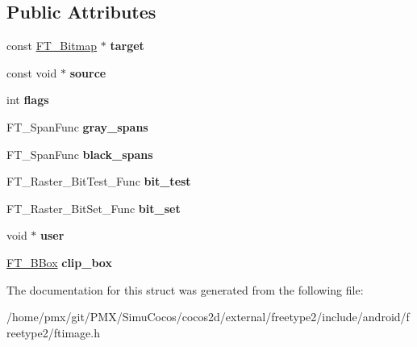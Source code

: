\subsection*{Public Attributes}
\begin{DoxyCompactItemize}
\item 
\mbox{\label{structFT__Raster__Params___a1180854ce8685d69061bb11de5f87665}} 
const \hyperlink{structFT__Bitmap__}{F\+T\+\_\+\+Bitmap} $\ast$ {\bfseries target}
\item 
\mbox{\label{structFT__Raster__Params___a00fa3f94836780ef70feb9d4785e98b8}} 
const void $\ast$ {\bfseries source}
\item 
\mbox{\label{structFT__Raster__Params___a1a28ab69b8296b4378886d1a2b57d333}} 
int {\bfseries flags}
\item 
\mbox{\label{structFT__Raster__Params___a456191f1944775933e3d9d36c8632c35}} 
F\+T\+\_\+\+Span\+Func {\bfseries gray\+\_\+spans}
\item 
\mbox{\label{structFT__Raster__Params___a42c30e60ad5e243cf78833232e052b47}} 
F\+T\+\_\+\+Span\+Func {\bfseries black\+\_\+spans}
\item 
\mbox{\label{structFT__Raster__Params___aff3c1a2a7eda24136a46715128d24ed6}} 
F\+T\+\_\+\+Raster\+\_\+\+Bit\+Test\+\_\+\+Func {\bfseries bit\+\_\+test}
\item 
\mbox{\label{structFT__Raster__Params___ac66c3c44fcb63c254a46170d85d653c0}} 
F\+T\+\_\+\+Raster\+\_\+\+Bit\+Set\+\_\+\+Func {\bfseries bit\+\_\+set}
\item 
\mbox{\label{structFT__Raster__Params___a343e1a204b7509471006f89c3720dc02}} 
void $\ast$ {\bfseries user}
\item 
\mbox{\label{structFT__Raster__Params___ab32f75f19d9cacb20e410886c055e306}} 
\hyperlink{structFT__BBox__}{F\+T\+\_\+\+B\+Box} {\bfseries clip\+\_\+box}
\end{DoxyCompactItemize}


The documentation for this struct was generated from the following file\+:\begin{DoxyCompactItemize}
\item 
/home/pmx/git/\+P\+M\+X/\+Simu\+Cocos/cocos2d/external/freetype2/include/android/freetype2/ftimage.\+h\end{DoxyCompactItemize}
